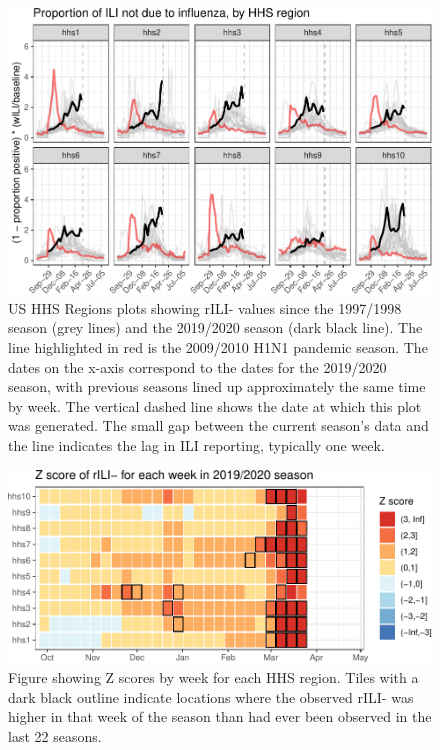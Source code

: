 \documentclass[]{article}
\begin{document}
\begin{figure}
\centering
\includegraphics{ili-labtest-report_files/figure-latex/all-region-plot-ILI-1.pdf}
\caption{\label{fig:all-region-plot}US HHS Regions plots showing rILI-
values since the 1997/1998 season (grey lines) and the 2019/2020 season
(dark black line). The line highlighted in red is the 2009/2010 H1N1
pandemic season. The dates on the x-axis correspond to the dates for the
2019/2020 season, with previous seasons lined up approximately the same
time by week. The vertical dashed line shows the date at which this plot
was generated. The small gap between the current season's data and the
line indicates the lag in ILI reporting, typically one week.}
\end{figure}

\begin{figure}
\centering
\includegraphics{ili-labtest-report_files/figure-latex/std-dev-analysis-1.pdf}
\caption{Figure showing Z scores by week for each HHS region. Tiles with
a dark black outline indicate locations where the observed rILI- was
higher in that week of the season than had ever been observed in the
last 22 seasons.}
\end{figure}
\end{document}
